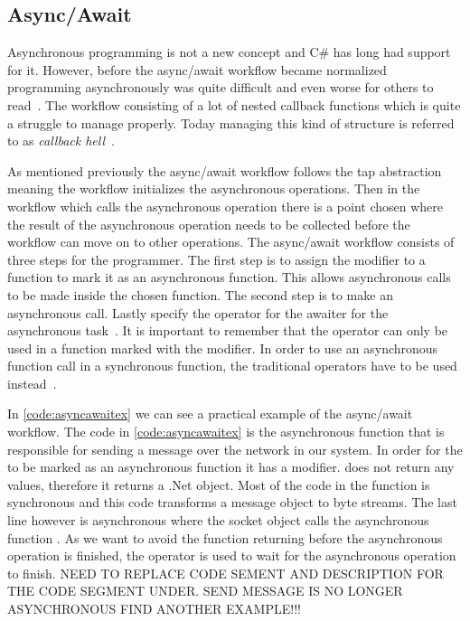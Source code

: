\subsection{Async/Await}
Asynchronous programming is not a new concept and C\# has long had support for it. However, before the async/await workflow became normalized programming asynchronously was quite difficult and even worse for others to read~\cite{DOC:TaskAsyncProgModel}. The workflow consisting of a lot of nested callback functions which is quite a struggle to manage properly. Today managing this kind of structure is referred to as \emph{callback hell}~\cites[p.~1-2]{PAPER:Callbackhell}[p~.2]{PAPER:PaxosCleipnir}.

As mentioned previously the async/await workflow follows the \ac{tap} abstraction~\cite{DOC:TaskAsyncProgModel} meaning the workflow initializes the asynchronous operations. Then in the workflow which calls the asynchronous operation there is a point chosen where the result of the asynchronous operation needs to be collected before the workflow can move on to other operations. The async/await workflow consists of three steps for the programmer. The first step is to assign the  modifier to a function to mark it as an asynchronous function. This allows asynchronous calls to be made inside the chosen function. The second step is to make an asynchronous call. Lastly specify the  operator for the awaiter for the asynchronous task~\cite{WEB:AsyncAwaitTut, DOC:AsyncAwait, VIDEO:AsyncConBack}.
It is important to remember that the  operator can only be used in a function marked with the  modifier. In order to use an asynchronous function call in a synchronous function, the traditional operators have to be used instead~\cite{DOC:AsyncAwait, DOC:TaskAsyncProgModel}.

In \autoref{code:asyncawaitex} we can see a practical example of the async/await workflow.
The code in \autoref{code:asyncawaitex} is the asynchronous function that is responsible for sending a message over the network in our system. In order for the  to be marked as an asynchronous function it has a  modifier.  does not return any values, therefore it returns a .Net  object. Most of the code in the function is synchronous and this code transforms a message object to byte streams. The last line however is asynchronous where the socket object calls the asynchronous function . As we want to avoid the function returning before the asynchronous operation is finished, the  operator is used to wait for the asynchronous operation to finish.
NEED TO REPLACE CODE SEMENT AND DESCRIPTION FOR THE CODE SEGMENT UNDER. SEND MESSAGE IS NO LONGER ASYNCHRONOUS FIND ANOTHER EXAMPLE!!!

